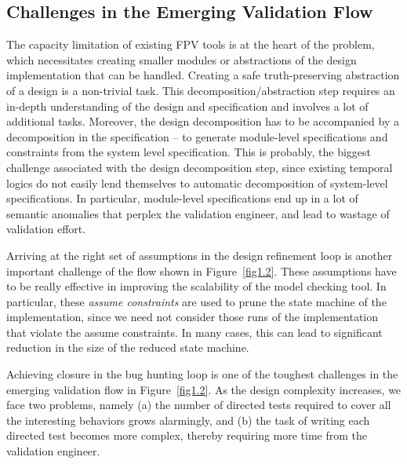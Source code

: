 \subsection{Challenges in the Emerging Validation Flow} \label{sec1.1.1}
The capacity limitation of existing FPV tools is at the heart of the 
problem, which necessitates creating smaller modules or abstractions 
of the design implementation that can be handled. Creating a safe 
truth-preserving abstraction of a design is a non-trivial task. 
This decomposition/abstraction step requires an in-depth understanding of 
the design and specification and involves a lot of additional tasks. 
Moreover, the design decomposition has to be accompanied by a 
decomposition in the specification -- to generate module-level specifications 
and constraints from the system level specification. This is probably, the 
biggest challenge associated with the design decomposition step, since 
existing temporal logics do not easily lend themselves to automatic 
decomposition of system-level specifications. In particular, 
module-level specifications end up in a lot of semantic anomalies that 
perplex the validation engineer, and lead to wastage of validation effort. 

\noindent
Arriving at the right set of assumptions in the design refinement loop 
is another important challenge of the flow shown in Figure~\ref{fig1.2}. 
These assumptions have to be really effective in improving the scalability 
of the model checking tool. In particular, these {\em assume constraints} 
are used to prune the state machine of the implementation, since we need 
not consider those runs of the implementation that violate the assume 
constraints. In many cases, this can lead to significant reduction in 
the size of the reduced state machine. 

\noindent
Achieving closure in the bug hunting loop is one of the toughest 
challenges in the emerging validation flow in Figure~\ref{fig1.2}.
As the design complexity increases, we face two problems, namely (a) the
number of directed tests required to cover all the interesting behaviors
grows alarmingly, and (b) the task of writing each directed test becomes
more complex, thereby requiring more time from the validation engineer. 


